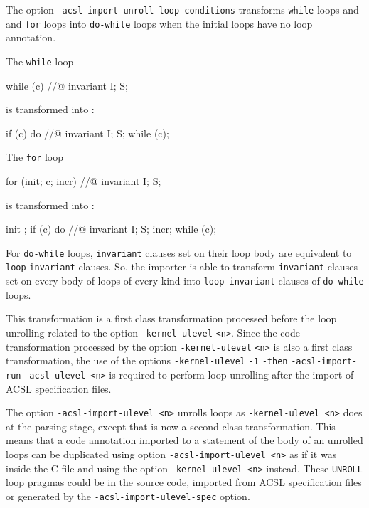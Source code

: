 \documentclass{frama-c-book}
\begin{document}
The option \verb|-acsl-import-unroll-loop-conditions| transforms \verb|while| loops and and \verb|for| loops into \verb|do-while| loops when the initial loops have no loop annotation.

The \verb|while| loop
\begin{shell}
  while (c)
    //@ invariant I;
    S;
\end{shell}
is transformed into :
\begin{shell}
  if (c)
    do //@ invariant I;
      S;
    while (c);
\end{shell}

The \verb|for| loop
\begin{shell}
  for (init; c; incr)
    //@ invariant I;
    S;
\end{shell}
is transformed into :
\begin{shell}
  init ;
  if (c)
    do //@ invariant I;
    { S;
      incr;
    } while (c);
\end{shell}

For \verb|do-while| loops, \verb|invariant| clauses set on their loop body are equivalent to \verb|loop| \verb|invariant| clauses.
So, the importer is able to transform \verb|invariant| clauses set on every body of loops of every kind into \verb|loop invariant| clauses of \verb|do-while| loops.

This transformation is a first class transformation processed before the loop unrolling related to the option \verb|-kernel-ulevel| \verb|<n>|.
Since the code transformation processed by the option \verb|-kernel-ulevel| \verb|<n>| is also a first class transformation, the use of the options \verb|-kernel-ulevel| \verb|-1| {\tt <acsl-import-options>} \verb|-then| \verb|-acsl-import-run| \verb|-acsl-ulevel <n>| is required to perform loop unrolling after the import of ACSL specification files.

The option \verb|-acsl-import-ulevel <n>| unrolls loops as \verb|-kernel-ulevel <n>| does at the parsing stage, except that is now a second class transformation.
This means that a code annotation imported to a statement of the body of an unrolled loops can be duplicated using option \verb|-acsl-import-ulevel <n>| as if it was inside the C file and using the option \verb|-kernel-ulevel <n>| instead.
These \verb|UNROLL| loop pragmas could be in the source code, imported from ACSL specification files or generated by the {\tt\/-acsl-import-ulevel-spec} option.
\end{document}

